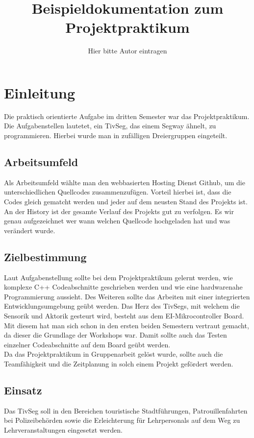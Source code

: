 \documentclass[a4paper,10pt,twoside]{report}
\title{Beispieldokumentation zum Projektpraktikum}
\author{Hier bitte Autor eintragen}
\begin{document}

\tableofcontents

\chapter{Einleitung}
Die praktisch orientierte Aufgabe im dritten Semester war das Projektpraktikum. Die Aufgabenstellen  lautetet, ein TivSeg, das einem Segway ähnelt, zu programmieren. Hierbei wurde man in zufälligen Dreiergruppen eingeteilt. 
\section{Arbeitsumfeld}
Als Arbeitsumfeld wählte man den webbasierten Hosting Dienst Github, um die unterschiedlichen Quellcodes zusammenzufügen. Vorteil hierbei ist, dass die Codes gleich gematcht werden und jeder auf dem neusten Stand des Projekts ist. An der History ist der gesamte Verlauf des Projekts gut zu verfolgen. Es wir genau aufgezeichnet wer wann welchen Quellcode hochgeladen hat und was verändert wurde.
\section{Zielbestimmung}
Laut Aufgabenstellung sollte bei dem Projektpraktikum gelernt werden, wie  komplexe C++ Codeabschnitte geschrieben werden und wie eine hardwarenahe Programmierung aussieht. Des Weiteren sollte das Arbeiten mit einer integrierten Entwicklungsumgebung geübt werden. Das Herz des TivSegs, mit welchem die Sensorik und Aktorik gesteurt wird, besteht aus dem EI-Mikrocontroller Board. Mit diesem hat man sich schon in den ersten beiden Semestern vertraut gemacht, da dieser die Grundlage der Workshops war.  Damit sollte auch das Testen einzelner Codeabschnitte auf dem Board geübt werden.\\
Da das Projektpraktikum in Gruppenarbeit gelöst wurde, sollte auch die Teamfähigkeit und die Zeitplanung in solch einem Projekt gefördert werden.
\section{Einsatz}
Das TivSeg soll in den Bereichen touristische Stadtführungen, Patrouillenfahrten bei
Polizeibehörden sowie die Erleichterung für Lehrpersonals auf dem Weg zu Lehrveranstaltungen eingesetzt werden. 
\end{document}
